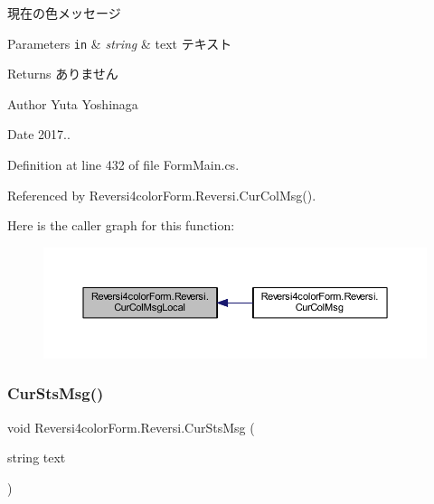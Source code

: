 現在の色メッセージ 


\begin{DoxyParams}[1]{Parameters}
\mbox{\tt in}  & {\em string} & text テキスト \\
\hline
\end{DoxyParams}
\begin{DoxyReturn}{Returns}
ありません 
\end{DoxyReturn}
\begin{DoxyAuthor}{Author}
Yuta Yoshinaga 
\end{DoxyAuthor}
\begin{DoxyDate}{Date}
2017.. 
\end{DoxyDate}


Definition at line 432 of file Form\+Main.\+cs.



Referenced by Reversi4color\+Form.\+Reversi.\+Cur\+Col\+Msg().

Here is the caller graph for this function\+:\nopagebreak
\begin{figure}[H]
\begin{center}
\leavevmode
\includegraphics[width=350pt]{class_reversi4color_form_1_1_reversi_a6ab2074a5474736e76644cf45c08827b_icgraph}
\end{center}
\end{figure}
\mbox{\label{class_reversi4color_form_1_1_reversi_af82882188f72f849b21890fe21199083}} 
\subsubsection{\texorpdfstring{Cur\+Sts\+Msg()}{CurStsMsg()}}
{\footnotesize\ttfamily void Reversi4color\+Form.\+Reversi.\+Cur\+Sts\+Msg (\begin{DoxyParamCaption}\item[{string}]{text }\end{DoxyParamCaption})}



